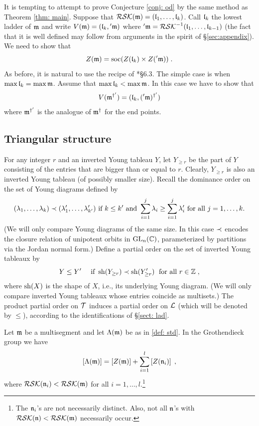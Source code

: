 \documentclass{ert-l} %
\begin{document}
It is tempting to attempt to prove Conjecture \ref{conj: od} by the same method as Theorem \ref{thm: main}.
Suppose that $\mathcal{RSK}(\mathfrak{m})=(\mathfrak{l}_1,\dots,\mathfrak{l}_k)$.
Call $\mathfrak{l}_k$ the lowest ladder of $\mathfrak{m}$ and write $V(\mathfrak{m})=(\mathfrak{l}_k,{}'\mathfrak{m})$
where ${}'\mathfrak{m}=\mathcal{RSK}^{-1}(\mathfrak{l}_1,\dots,\mathfrak{l}_{k-1})$ (the fact that it is well defined may follow from arguments in the spirit of \S\ref{sec:appendix}).
We need to show that
\[
Z(\mathfrak{m})=\operatorname{soc}(Z(\mathfrak{l}_k)\times Z({}'\mathfrak{m}))\;.
\]
As before, it is natural to use the recipe of \cite{MR3573961}*{\S6.3}.
The simple case is when $\max\mathfrak{l}_k=\max\mathfrak{m}$.
Assume that $\max\mathfrak{l}_k<\max\mathfrak{m}$. In this case we have to show that
\begin{equation} \label{eq: vmk}
V(\mathfrak{m}^{\dagger'})=(\mathfrak{l}_k,({}'\mathfrak{m})^{\dagger'})
\end{equation}
where $\mathfrak{m}^{\dagger'}$ is the analogue of $\mathfrak{m}^{\dagger}$ for the end points.


\subsection{Triangular structure}\label{sect: tri}

For any integer $r$ and an inverted Young tableau $Y$, let $Y_{\ge r}$
be the part of $Y$ consisting of the entries that are bigger than or
equal to $r$. Clearly, $Y_{\ge r}$ is also an inverted Young tableau (of possibly smaller size). Recall the dominance order on the set of Young diagrams defined by
\[
(\lambda_1,\dots,\lambda_k)\prec (\lambda_1',\dots,\lambda'_{k'})\text{ if }
k\le k'\text{ and }\sum_{i=1}^j\lambda_i\ge\sum_{i=1}^j\lambda'_i\text{ for all }
j=1,\dots,k.
\]
(We will only compare Young diagrams of the same size. In this case $\prec$ encodes the
closure relation of unipotent orbits in $\operatorname{GL}_n(\mathbb{C})$, parameterized by partitions via the Jordan normal form.)
Define a partial order on the set of inverted Young tableaux by
\[
Y\le Y'\quad \text{ if }\operatorname{sh}(Y_{\ge r})\prec\operatorname{sh}(Y'_{\ge r})\;\text{ for all }r\in\mathbb{Z}\;,
\]
where $\operatorname{sh}(X)$ is the shape of $X$, i.e., its underlying Young diagram.
(We will only compare inverted Young tableaux whose entries coincide
as multisets.)
The product partial order on $\mathcal{T}$ induces a partial order
on $\mathcal{L}$ (which will be denoted by $\le$), according to the identifications of \S\ref{sect: lad}.


\begin{conjecture}\label{conj: triang}
Let $\mathfrak{m}$ be a multisegment and let $\Lambda(\mathfrak{m})$ be as in \eqref{def: std}. In the Grothendieck group we have
\[
\left[\Lambda(\mathfrak{m})\right]=\left[Z(\mathfrak{m})\right]+\sum_{i=1}^l\left[ Z(\mathfrak{n}_i)\right]\;,
\]
where $\mathcal{RSK}(\mathfrak{n}_i)<\mathcal{RSK}(\mathfrak{m})$ for all $i=1,\dots,l$.\footnote{The $\mathfrak{n}_i$'s are not necessarily distinct.
Also, not all $\mathfrak{n}$'s with $\mathcal{RSK}(\mathfrak{n})<\mathcal{RSK}(\mathfrak{m})$ necessarily occur.}
\end{conjecture}
\end{document}
